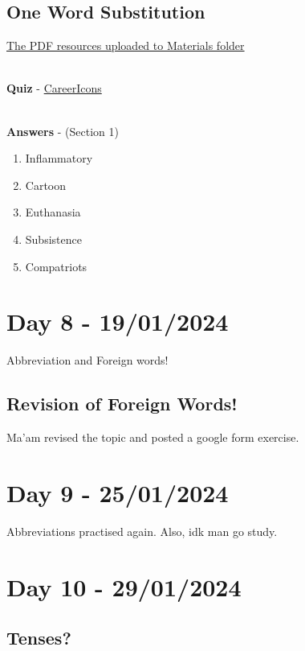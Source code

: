 \documentclass[a4paper,30pt]{report}
\begin{document}
    \section{One Word Substitution}
      \underline{The PDF resources uploaded to Materials folder}\\\\

      \par \textbf{Quiz} - \href{https://careericons.com/general-english-mcq/one-word-substitution/section-1-question-answer/154-1/}{CareerIcons}\\\\

      \par \textbf{Answers} - (Section 1) 
        \begin{enumerate}
          \item Inflammatory
          \item Cartoon
          \item Euthanasia
          \item Subsistence
          \item Compatriots
        \end{enumerate}
  


  \chapter{Day 8 - 19/01/2024} %
  \label{chap:Day 8 - 19/01/2024}
    Abbreviation and Foreign words!
    \section{Revision of Foreign Words!}
       Ma'am revised the topic and posted a google form exercise. 

  \chapter{Day 9 - 25/01/2024} %
  \label{chap:Day 9 - 25/01/2024}
    Abbreviations practised again. 
    Also, idk man go study. 

  \chapter{Day 10 - 29/01/2024} %
  \label{chap:Day 10 - 29/01/2024}
    \section{Tenses?} %
    \label{sec:Tenses?}
    
\end{document}
